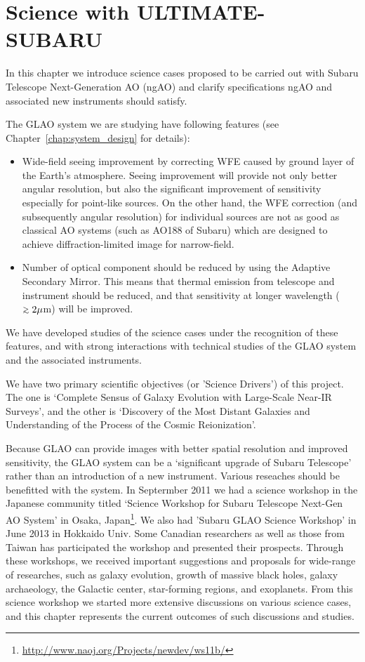 \chapter{Science with ULTIMATE-SUBARU 
\label{chap:science}}

In this chapter we introduce science cases proposed to be carried out
with Subaru Telescope Next-Generation AO (ngAO) and clarify
specifications ngAO and associated new instruments should satisfy.

The GLAO system we are studying have following features (see
Chapter~\ref{chap:system_design} for details):

\begin{itemize}
\item Wide-field seeing improvement by correcting WFE caused by ground
      layer of the Earth's atmosphere. Seeing improvement will provide
      not only better angular resolution, but also the significant
      improvement of sensitivity especially for point-like sources. On
      the other hand, the WFE correction (and subsequently angular
      resolution) for individual sources are not as good as classical AO
      systems (such as AO188 of Subaru) which are designed to achieve
      diffraction-limited image for narrow-field. 
\item Number of optical component should be reduced by using the
      Adaptive Secondary Mirror. This means that thermal emission from
      telescope and instrument should be reduced, and that sensitivity
      at longer wavelength ($\gsim 2\mu$m) will be improved.
\end{itemize}

We have developed studies of the science cases under the recognition of
these features, and with strong interactions with technical studies of
the GLAO system and the associated instruments.

We have two primary scientific objectives (or 'Science Drivers') of this
project. The one is `Complete Sensus of Galaxy Evolution with
Large-Scale Near-IR Surveys', and the other is `Discovery of the Most
Distant Galaxies and Understanding of the Process of the Cosmic
Reionization'.

Because GLAO can provide images with better spatial resolution and
improved sensitivity, the GLAO system can be a `significant upgrade
of Subaru Telescope' rather than an introduction of a new
instrument. Various reseaches should be benefitted with the system.
In Septermber 2011 we had a science workshop in the Japanese community
titled `Science Workshop for Subaru Telescope Next-Gen AO System' in
Osaka,
Japan\footnote{\href{http://www.naoj.org/Projects/newdev/ws11b/index.html}{http://www.naoj.org/Projects/newdev/ws11b/}}. 
We also had 'Subaru GLAO Science Workshop' in June 2013 in Hokkaido
Univ. Some Canadian researchers as well as those from Taiwan has
participated the workshop and presented their prospects. 
Through these workshops, we received important suggestions and proposals
for wide-range of researches, such as galaxy evolution, growth of
massive black holes, galaxy archaeology, the Galactic center,
star-forming regions, and exoplanets. From this science workshop we
started more extensive discussions on various science cases, and this
chapter represents the current outcomes of such discussions and studies.
